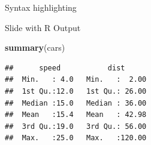 \documentclass[,]{beamer}
\newenvironment{Shaded}{\begin{snugshade}}{\end{snugshade}}
\newcommand{\CommentTok}[1]{\textcolor[rgb]{0.56,0.35,0.01}{\textit{#1}}}
\newcommand{\ControlFlowTok}[1]{\textcolor[rgb]{0.13,0.29,0.53}{\textbf{#1}}}
\newcommand{\DataTypeTok}[1]{\textcolor[rgb]{0.13,0.29,0.53}{#1}}
\newcommand{\DecValTok}[1]{\textcolor[rgb]{0.00,0.00,0.81}{#1}}
\newcommand{\KeywordTok}[1]{\textcolor[rgb]{0.13,0.29,0.53}{\textbf{#1}}}
\newcommand{\NormalTok}[1]{#1}
\newcommand{\OperatorTok}[1]{\textcolor[rgb]{0.81,0.36,0.00}{\textbf{#1}}}
\newcommand{\OtherTok}[1]{\textcolor[rgb]{0.56,0.35,0.01}{#1}}
\newcommand{\StringTok}[1]{\textcolor[rgb]{0.31,0.60,0.02}{#1}}
\begin{document}
\begin{frame}[fragile]{Syntax highlighting}
\protect\hypertarget{syntax-highlighting}{}

\begin{Shaded}
\end{Shaded}

\end{frame}

\begin{frame}[fragile]{Slide with R Output}
\protect\hypertarget{slide-with-r-output}{}

\begin{Shaded}
\begin{Highlighting}[]
\KeywordTok{summary}\NormalTok{(cars)}
\end{Highlighting}
\end{Shaded}

\begin{verbatim}
##      speed           dist       
##  Min.   : 4.0   Min.   :  2.00  
##  1st Qu.:12.0   1st Qu.: 26.00  
##  Median :15.0   Median : 36.00  
##  Mean   :15.4   Mean   : 42.98  
##  3rd Qu.:19.0   3rd Qu.: 56.00  
##  Max.   :25.0   Max.   :120.00
\end{verbatim}

\end{frame}
\end{document}
